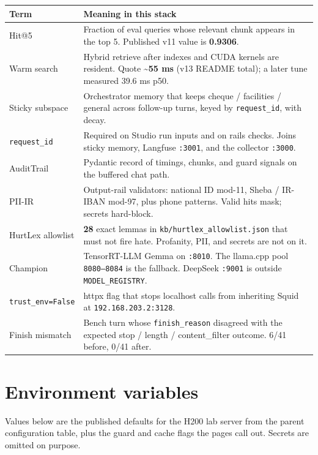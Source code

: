 \begin{longtable}[]{@{}
  >{\raggedright\arraybackslash}p{}
  >{\raggedright\arraybackslash}p{}@{}}
\toprule\noalign{}
Term & Meaning in this stack \\
\midrule\noalign{}
\endhead
\bottomrule\noalign{}
\endlastfoot
Hit@5 & Fraction of eval queries whose relevant chunk appears in the top 5. Published v11 value is \textbf{0.9306}. \\
Warm search & Hybrid retrieve after indexes and CUDA kernels are resident. Quote \textbf{\textasciitilde55 ms} (v13 README total); a later tune measured 39.6 ms p50. \\
Sticky subspace & Orchestrator memory that keeps cheque / facilities / general across follow-up turns, keyed by \texttt{request\_id}, with decay. \\
\texttt{request\_id} & Required on Studio run inputs and on rails checks. Joins sticky memory, Langfuse \texttt{:3001}, and the collector \texttt{:3000}. \\
AuditTrail & Pydantic record of timings, chunks, and guard signals on the buffered chat path. \\
PII-IR & Output-rail validators: national ID mod-11, Sheba / IR-IBAN mod-97, plus phone patterns. Valid hits mask; secrets hard-block. \\
HurtLex allowlist & \textbf{28} exact lemmas in \texttt{kb/hurtlex\_allowlist.json} that must not fire hate. Profanity, PII, and secrets are not on it. \\
Champion & TensorRT-LLM Gemma on \texttt{:8010}. The llama.cpp pool \texttt{8080–8084} is the fallback. DeepSeek \texttt{:9001} is outside \texttt{MODEL\_REGISTRY}. \\
\texttt{trust\_env=False} & httpx flag that stops localhost calls from inheriting Squid at \texttt{192.168.203.2:3128}. \\
Finish mismatch & Bench turn whose \texttt{finish\_reason} disagreed with the expected stop / length / content\_filter outcome. 6/41 before, 0/41 after. \\
\end{longtable}

\section{Environment variables}\label{environment-variables}

Values below are the published defaults for the H200 lab server from the parent configuration table, plus the guard and cache flags the pages call out. Secrets are omitted on purpose.

